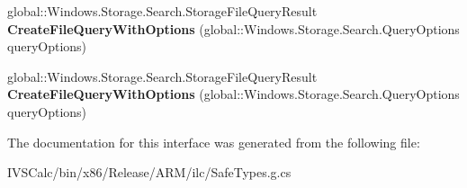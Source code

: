 \begin{DoxyCompactItemize}
global\+::\+Windows.\+Storage.\+Search.\+Storage\+File\+Query\+Result {\bfseries Create\+File\+Query\+With\+Options} (global\+::\+Windows.\+Storage.\+Search.\+Query\+Options query\+Options)
\item 
\mbox{\label{interface_windows_1_1_storage_1_1_search_1_1_i_storage_folder_query_operations_aba4a49d99cc5dcfe31515c6c3c793b03}} 
global\+::\+Windows.\+Storage.\+Search.\+Storage\+File\+Query\+Result {\bfseries Create\+File\+Query\+With\+Options} (global\+::\+Windows.\+Storage.\+Search.\+Query\+Options query\+Options)
\end{DoxyCompactItemize}


The documentation for this interface was generated from the following file\+:\begin{DoxyCompactItemize}
\item 
I\+V\+S\+Calc/bin/x86/\+Release/\+A\+R\+M/ilc/Safe\+Types.\+g.\+cs\end{DoxyCompactItemize}
